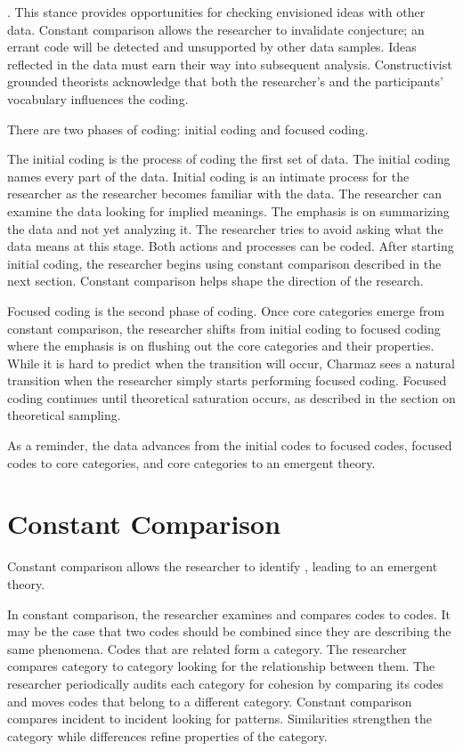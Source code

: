  \cite{Charmaz}. This stance provides opportunities for checking envisioned ideas with other data. Constant comparison allows the researcher to invalidate conjecture; an errant code will be detected and unsupported by other data samples. Ideas reflected in the data must earn their way into subsequent analysis. Constructivist grounded theorists acknowledge that both the researcher's and the participants' vocabulary influences the coding.

There are two phases of coding: initial coding and focused coding. 

The initial coding is the process of coding the first set of data. The initial coding names every part of the data. Initial coding is an intimate process for the researcher as the researcher becomes familiar with the data. The researcher can examine the data looking for implied meanings. The emphasis is on summarizing the data and not yet analyzing it. The researcher tries to avoid asking what the data means at this stage. Both actions and processes can be coded. After starting initial coding, the researcher begins using constant comparison described in the next section. Constant comparison helps shape the direction of the research. 

Focused coding is the second phase of coding. Once core categories emerge from constant comparison, the researcher shifts from initial coding to focused coding where the emphasis is on flushing out the core categories and their properties. While it is hard to predict when the transition will occur, Charmaz sees a natural transition when the researcher simply starts performing focused coding. Focused coding continues until theoretical saturation occurs, as described in the section on theoretical sampling.

As a reminder, the data advances from the initial codes to focused codes, focused codes to core categories, and core categories to an emergent theory. 

\section{Constant Comparison}
Constant comparison allows the researcher to identify  \cite{GlaserBasics}, leading to an emergent theory.

In constant comparison, the researcher examines and compares codes to codes. It may be the case that two codes should be combined since they are describing the same phenomena. Codes that are related form a category. The researcher compares category to category looking for the relationship between them. The researcher periodically audits each category for cohesion by comparing its codes and moves codes that belong to a different category. Constant comparison compares incident to incident looking for patterns. Similarities strengthen the category while differences refine properties of the category. 

